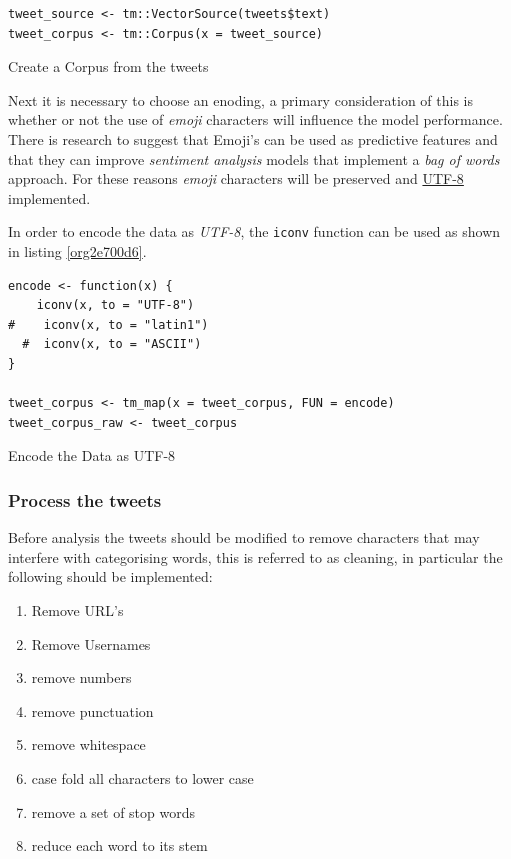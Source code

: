 \documentclass[11pt]{article}
\begin{document}
\begin{listing}[htbp]
\begin{verbatim}
tweet_source <- tm::VectorSource(tweets$text)
tweet_corpus <- tm::Corpus(x = tweet_source)
\end{verbatim}
\caption{\label{org99b939c}Create a Corpus from the tweets}
\end{listing}

Next it is necessary to choose an enoding, a primary consideration of this is whether or not the use of \emph{emoji} characters will influence the model performance. There is research to suggest that Emoji's can be used as predictive features \cite{lecompte2017} and that they can improve \emph{sentiment analysis} models \cite{shiha2017} that implement a \emph{bag of words} approach. For these reasons \emph{emoji} characters will be preserved and \href{http://www.utf-8.com/}{UTF-8} implemented.

In order to encode the data as \emph{UTF-8}, the \texttt{iconv} function can be used as shown in listing \ref{org2e700d6}.

\begin{listing}[htbp]
\begin{verbatim}
encode <- function(x) {
    iconv(x, to = "UTF-8")
#    iconv(x, to = "latin1")
  #  iconv(x, to = "ASCII")
}

tweet_corpus <- tm_map(x = tweet_corpus, FUN = encode)
tweet_corpus_raw <- tweet_corpus
\end{verbatim}
\caption{\label{org2e700d6}Encode the Data as UTF-8}
\end{listing}

\subsubsection{Process the tweets}
\label{sec:org93b639e}
Before analysis the tweets should be modified to remove characters that may interfere with categorising words, this is referred to as cleaning, in particular the following should be implemented:

\begin{enumerate}
\item Remove URL's
\item Remove Usernames
\item remove numbers
\item remove punctuation
\item remove whitespace
\item case fold all characters to lower case
\item remove a set of stop words
\item reduce each word to its stem
\end{enumerate}
\end{document}
